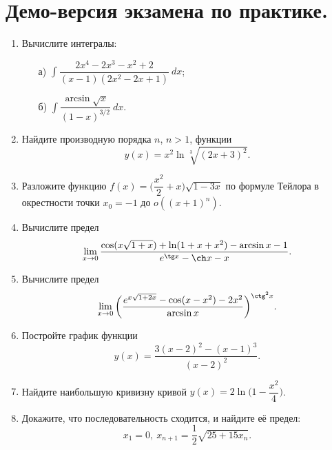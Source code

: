 \documentclass[a4paper,12pt]{article}
\begin{document}
\section*{Демо-версия экзамена по практике.}

\begin{enumerate}
     	\item Вычислите интегралы:
     	\begin{enumerate}
     		\item[а)] $ \displaystyle \int \dfrac{2x^4 - 2x^3 - x^2 + 2}{(x - 1)(2x^2 - 2x + 1)} \ dx$;
     		\item[б)] $ \displaystyle \int \dfrac{\arcsin \sqrt{x}}{(1 - x)^{3/2}} \ dx$.
     	\end{enumerate} 
     	
     	\item Найдите производную порядка $n$, $n > 1$, функции \[ y(x) = x^2 \ln \sqrt[3]{(2x + 3)^2}. \]
     	\item Разложите функцию $f(x) = \bigg( \dfrac{x^2}{2} + x \bigg) \sqrt{1 - 3x}$ по формуле Тейлора в окрестности точки $x_0 = -1$ до $o( (x+1)^n )$.  
     	\item Вычислите предел \[ \lim\limits_{x \to 0} \dfrac{\cos (x \sqrt{1 + x}) + \ln (1 + x + x^2) - \arcsin x - 1}{e^{\tg x} - \ch x - x}. \]
     	\item Вычислите предел \[ \lim\limits_{x \to 0} \bigg( \dfrac{e^{x \sqrt{1 + 2x}} - \cos(x - x^2) - 2x^2}{\arcsin x} \bigg)^{\ctg^2 x}. \] 
     	\item Постройте график функции \[ y(x) = \dfrac{3 (x - 2)^2 - (x - 1)^3}{(x - 2)^2} .\]  
     	\item Найдите наибольшую кривизну кривой $y(x) = 2 \ln \bigg( 1 - \dfrac{x^2}{4} \bigg)$. 
     	\item Докажите, что последовательность сходится, и найдите её предел:
     		\[ x_1 = 0, \ x_{n+1} = \dfrac{1}{2} \sqrt{25 + 15 x_n}. \] 	 	     	
\end{enumerate}
\end{document}

